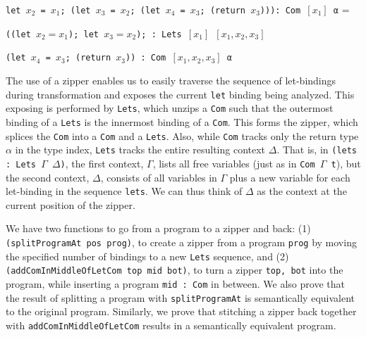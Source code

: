 \vspace{.5em}
\begingroup
{\small
\colorbox{MediumGrayColor}{
	\texttt{let $x_2$ = $x_1$; (let $x_3$ = $x_2$; (let $x_4$ = $x_3$; (return $x_3$))): Com $[x_1]$ α}
}
=

\quad \colorbox{DarkGrayColor}{
	\texttt{((let $x_2 = x_1$); let $x_3 = x_2$); : Lets $[x_1]$ $[x_1, x_2, x_3]$}
}

\quad \colorbox{pairedThreeLightGreen}{
\texttt{(let $x_4$ = $x_3$; (return $x_3$)) : Com $[x_1, x_2, x_3]$ α}
}
}
\label{fig:mlir:zipper}
\endgroup
\vspace{.5em}

The use of a zipper enables us to easily traverse the sequence of let-bindings during transformation and exposes the current \texttt{let} binding being analyzed.
This exposing is performed by \texttt{Lets}, which unzips a \texttt{Com} such that the outermost binding of a \texttt{Lets} is the innermost binding of a \texttt{Com}.
This forms the zipper, which splices the \texttt{Com} into a \texttt{Com} and a \texttt{Lets}.
Also, while \texttt{Com} tracks only the return type $\alpha$ in the type index, \texttt{Lets} tracks the entire resulting context $\Delta$.
That is, in \texttt{(lets : Lets $\Gamma$ $\Delta$)}, the first context, $\Gamma$, lists all free variables (just as in \texttt{Com $\Gamma$ t}), but the second context, $\Delta$, consists of all variables in $\Gamma$ plus a new variable for each let-binding in the sequence \texttt{lets}. We can thus think of $\Delta$ as the context at the current position of the zipper.

{\sloppypar
	We have two functions to go from a program to a zipper and back:
	(1) \texttt{(splitProgramAt pos prog)}, to create a zipper from a program \texttt{prog} by moving the specified number of bindings to a new \texttt{Lets} sequence, and
	(2) \texttt{(addComInMiddleOfLetCom top mid bot)}, to turn a zipper \texttt{top, bot} into the program, while inserting a program \texttt{mid~:~Com} in between.
}
We also prove that the result of splitting a program with \texttt{splitProgramAt} is semantically equivalent to the original program.
Similarly, we prove that stitching a zipper back together with \texttt{addComInMiddleOfLetCom} results in a semantically equivalent program.

